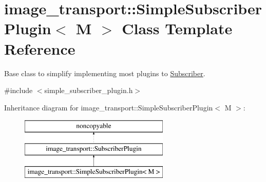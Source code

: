 \hypertarget{classimage__transport_1_1_simple_subscriber_plugin}{\section{image\-\_\-transport\-:\-:Simple\-Subscriber\-Plugin$<$ M $>$ Class Template Reference}
\label{classimage__transport_1_1_simple_subscriber_plugin}
}


Base class to simplify implementing most plugins to \hyperlink{classimage__transport_1_1_subscriber}{Subscriber}.  




{\ttfamily \#include $<$simple\-\_\-subscriber\-\_\-plugin.\-h$>$}

Inheritance diagram for image\-\_\-transport\-:\-:Simple\-Subscriber\-Plugin$<$ M $>$\-:\begin{figure}[H]
\begin{center}
\leavevmode
\includegraphics[height=3.000000cm]{classimage__transport_1_1_simple_subscriber_plugin}
\end{center}
\end{figure}
